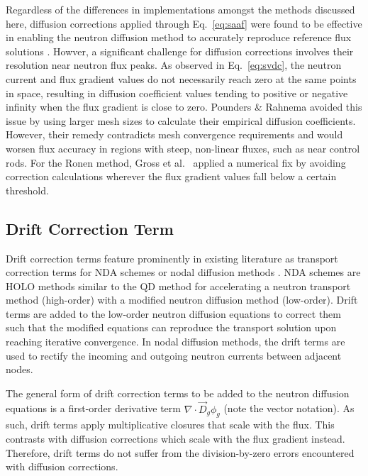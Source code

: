 Regardless of the differences in implementations amongst the methods discussed here,
diffusion corrections applied through Eq.\ \ref{eq:saaf} were
found to be effective in enabling the neutron diffusion method to accurately reproduce reference
flux solutions \cite{gross_comprehensive_2023, pounders_diffusion_2009}.
Howver, a significant challenge for diffusion corrections
involves their resolution near neutron flux peaks. As observed in Eq.\ \ref{eq:svdc}, the neutron
current and flux gradient values do not necessarily reach zero at the same points in space,
resulting in diffusion coefficient values tending to positive or negative infinity when the
flux gradient is close to zero. Pounders \& Rahnema avoided this issue by using
larger mesh sizes to calculate their empirical diffusion coefficients. However, their
remedy contradicts mesh convergence requirements and would worsen flux accuracy in regions with
steep, non-linear fluxes, such as near control rods. For the Ronen method, Gross et al.\
\cite{gross_comprehensive_2023} applied a numerical fix by avoiding correction
calculations wherever the flux gradient values fall below a certain threshold. 

\subsection{Drift Correction Term}

Drift correction terms feature prominently in existing literature as transport correction
terms for \gls{NDA} schemes or nodal diffusion methods
\cite{smith_nodal_1983, smith_assembly_1986, adams_fast_2002, wang_diffusion_2014}. \gls{NDA}
schemes are \gls{HOLO} methods \cite{chacon_multiscale_2017} similar to the \gls{QD} method for
accelerating a neutron transport
method (high-order) with a modified neutron diffusion method (low-order). Drift terms
are added to the low-order neutron diffusion equations to correct them such that the modified
equations can reproduce the transport solution upon reaching iterative convergence. In nodal
diffusion methods, the drift terms are used to rectify the incoming and outgoing neutron
currents between adjacent nodes.

The general form of drift correction terms to be added to the neutron diffusion equations is a
first-order derivative term $\nabla\cdot \vec{D}_g\phi_g$ (note the vector notation). As such,
drift terms apply
multiplicative closures that scale with the flux. This contrasts with diffusion
corrections which scale with the flux gradient instead. Therefore, drift terms do not suffer from
the division-by-zero errors encountered with diffusion corrections.

